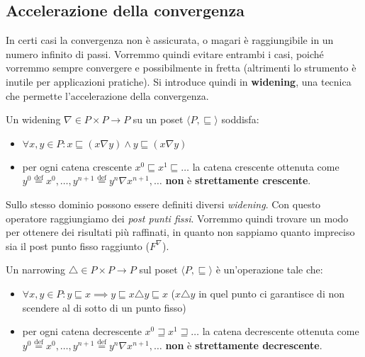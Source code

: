 \documentclass[a4paper, 10pt]{book}
\newenvironment{definition}[1][Definizione]{\begin{trivlist}
\item[\hskip \labelsep {\bfseries #1}]}{\end{trivlist}}
\begin{document}
\subsection{Accelerazione della convergenza}
In certi casi la convergenza non è assicurata, o magari è raggiungibile in un numero infinito di passi.
Vorremmo quindi evitare entrambi i casi, poiché vorremmo sempre convergere e possibilmente in fretta
(altrimenti lo strumento è inutile per applicazioni pratiche). Si introduce quindi in \textbf{widening},
una tecnica che permette l'accelerazione della convergenza.
\begin{definition}[Widening]
    Un widening $\nabla \in P \times P \to P$ su un poset $\langle P, \sqsubseteq \rangle$ soddisfa:
    \begin{itemize}
        \item $\forall x,y \in P : x \sqsubseteq (x \nabla y) \land y \sqsubseteq (x \nabla y)$
        \item per ogni catena crescente $x^0 \sqsubseteq x^1 \sqsubseteq \dots$ la catena crescente
            ottenuta come 
            $y^0 \overset{\mathrm{def}}{=} x^0, \dots, y^{n+1} 
            \overset{\mathrm{def}}{=} y^n \nabla x^{n+1}, \dots$
            \textbf{non} è \textbf{strettamente crescente}.
    \end{itemize}
\end{definition}
Sullo stesso dominio possono essere definiti diversi \emph{widening}. Con questo operatore raggiungiamo dei 
\emph{post punti fissi}. Vorremmo quindi trovare un modo per ottenere dei risultati più raffinati, in quanto
non sappiamo quanto impreciso sia il post punto fisso raggiunto ($F^\nabla$).
\begin{definition}[Narrowing]
    Un narrowing $\triangle \in P \times P \to P$ sul poset $\langle P, \sqsubseteq \rangle$ è un'operazione
    tale che:
    \begin{itemize}
        \item $\forall x,y \in P : y \sqsubseteq x \implies y \sqsubseteq x \triangle y \sqsubseteq x$
            ($ x \triangle y$ in quel punto ci garantisce di non scendere al di sotto di un punto fisso)
        \item per ogni catena decrescente $x^0 \sqsupseteq x^1 \sqsupseteq \dots$ la catena decrescente
            ottenuta come 
            $y^0 \overset{\mathrm{def}}{=} x^0, \dots, y^{n+1} 
            \overset{\mathrm{def}}{=} y^n \nabla x^{n+1}, \dots$
            \textbf{non} è \textbf{strettamente decrescente}.
    \end{itemize}
\end{definition}
\end{document}
